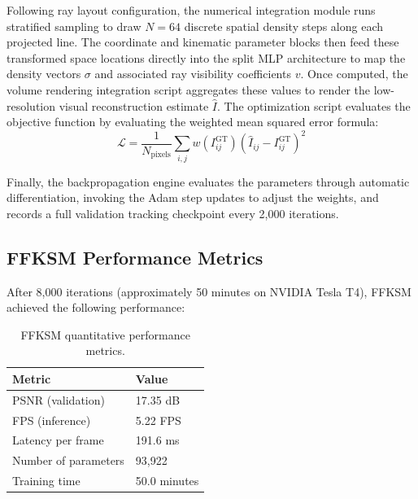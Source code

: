 \documentclass[12pt,a4paper,oneside]{report}
\begin{document}
Following ray layout configuration, the numerical integration module runs stratified sampling to draw $N=64$ discrete spatial density steps along each projected line. The coordinate and kinematic parameter blocks then feed these transformed space locations directly into the split MLP architecture to map the density vectors $\sigma$ and associated ray visibility coefficients $v$. Once computed, the volume rendering integration script aggregates these values to render the low-resolution visual reconstruction estimate $\hat{I}$. The optimization script evaluates the objective function by evaluating the weighted mean squared error formula:
\begin{equation}\mathcal{L} = \frac{1}{N_{\text{pixels}}} \sum_{i,j} w(I_{ij}^{\text{GT}}) (\hat{I}_{ij} - I_{ij}^{\text{GT}})^2
\end{equation}

Finally, the backpropagation engine evaluates the parameters through automatic differentiation, invoking the Adam step updates to adjust the weights, and records a full validation tracking checkpoint every 2,000 iterations.
\subsection{FFKSM Performance Metrics}
\label{subsec:ffksm_performance_metrics}

After 8,000 iterations (approximately 50 minutes on NVIDIA Tesla T4), FFKSM achieved the following performance:
\begin{table}[H]
\centering

\caption{FFKSM quantitative performance metrics.}
\label{tab:ffksm_performance}
\begin{tabular}{ll}
\toprule

\textbf{Metric} & \textbf{Value} \\
\midrule

PSNR (validation) & 17.35 dB \\

FPS (inference) & 5.22 FPS \\

Latency per frame & 191.6 ms \\

Number of parameters & 93,922 \\

Training time & 50.0 minutes \\
\bottomrule

\end{tabular}
\end{table}
\end{document}
